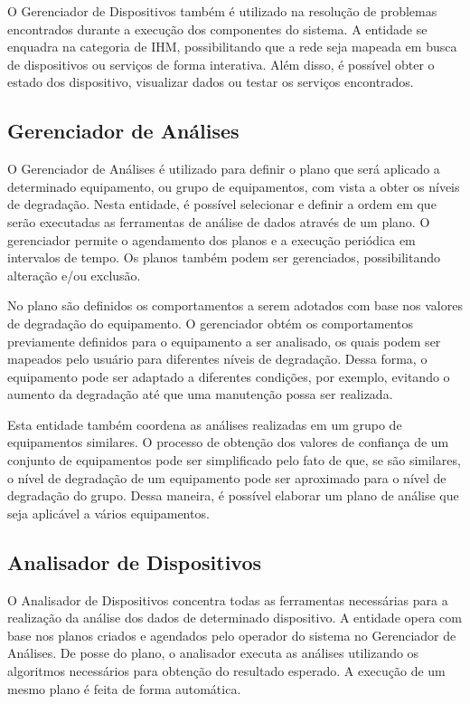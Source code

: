 O Gerenciador de Dispositivos também é utilizado na resolução de problemas encontrados durante a
execução dos componentes do sistema. A entidade se enquadra na categoria de \gls{IHM},
possibilitando que a rede seja mapeada em busca de dispositivos ou serviços de forma interativa.
Além disso, é possível obter o estado dos dispositivo, visualizar dados ou testar os serviços
encontrados.


\subsection{Gerenciador de Análises}
\label{sub:proposta-gerenciador-analises}

O Gerenciador de Análises é utilizado para definir o plano que será aplicado a determinado
equipamento, ou grupo de equipamentos, com vista a obter os níveis de degradação.
Nesta entidade, é possível selecionar e definir a ordem em que serão executadas as ferramentas de
análise de dados através de um plano. O gerenciador permite o agendamento dos planos e a execução
periódica em intervalos de tempo. Os planos também podem ser gerenciados, possibilitando alteração
e/ou exclusão.

No plano são definidos os comportamentos a serem adotados com base nos valores de degradação do
equipamento. O gerenciador obtém os comportamentos previamente definidos para o equipamento a ser
analisado, os quais podem ser mapeados pelo usuário para diferentes níveis de degradação. Dessa
forma, o equipamento pode ser adaptado a diferentes condições, por exemplo, evitando o aumento da
degradação até que uma manutenção possa ser realizada.

Esta entidade também coordena as análises realizadas em um grupo de equipamentos similares. O
processo de obtenção dos valores de confiança de um conjunto de equipamentos pode ser simplificado
pelo fato de que, se são similares, o nível de degradação de um equipamento pode ser aproximado para
o nível de degradação do grupo. Dessa maneira, é possível elaborar um plano de análise que seja
aplicável a vários equipamentos.


\subsection{Analisador de Dispositivos}
\label{sub:proposta-analisador-dispositivos}

O Analisador de Dispositivos concentra todas as ferramentas necessárias para a realização da análise
dos dados de determinado dispositivo. A entidade opera com base nos planos criados e agendados pelo
operador do sistema no Gerenciador de Análises. De posse do plano, o analisador executa as análises
utilizando os algoritmos necessários para obtenção do resultado esperado. A execução de um mesmo
plano é feita de forma automática.

